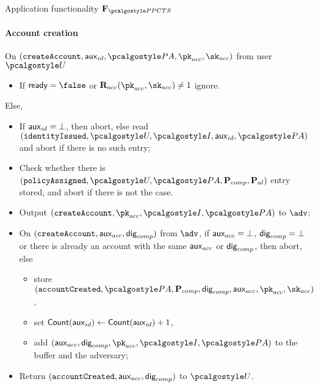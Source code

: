 \documentclass[runningheads,10pt]{llncs}
\numberwithin{equation}{section}
\begin{document}
\begin{funcbox}{Application functionality $\func{\PPCTS}$}
\paragraph{Account creation}
  On $(\createAccount, \auxid, \polas, \pkacc, \skacc)$ from
  user $\user$
  \begin{itemize}
  \item If $\ready = \false$ or $\RELacc (\pkacc, \skacc) \neq 1$ ignore.
  \end{itemize}
  Else,
  \begin{itemize}
  \item If $\mathsf{aux}_{id} = \bot$, then abort, else read $(\identityIssued, \user,
    \idprov, \auxid, \polas)$ and abort if there is no such entry;
  \item Check whether there is $(\policyAssigned, \user, \polas,
      \comppolicy, \alpolicy)$ entry stored, and abort if there is not the case.
  \item Output $(\createAccount, \pkacc, \idprov, \polas)$ to $\adv$;
  \item On $(\mathtt{createAccount}, \mathsf{aux}_{acc}, \mathsf{dig}_{comp})$ from $\adv$, if $\mathsf{aux}_{acc} =
    \bot$, $\mathsf{dig}_{comp} = \bot$ or there is already an account with the same
    $\mathsf{aux}_{acc}$ or $\mathsf{dig}_{comp}$, then abort, else
    \begin{itemize}
    \item store $(\accountCreated, \polas, \comppolicy, \policydig,
      \auxacc, \pkacc, \skacc)$,
    \item set $\mathsf{Count}(\mathsf{aux}_{id}) \gets \mathsf{Count}(\mathsf{aux}_{id}) + 1$,
    \item add $(\auxacc, \policydig, \pkacc, \idprov, \polas)$
      to the buffer and the adversary;
    \end{itemize}
  \item Return $(\mathtt{accountCreated}, \mathsf{aux}_{acc}, \mathsf{dig}_{comp})$ to $\user$.
\end{itemize}
  

\end{funcbox}
\end{document}
